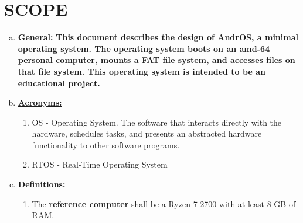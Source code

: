 \section{SCOPE}

\begin{enumerate}[(a)]
	\item \textbf{\underline{General:}} \textbf{This document describes the design of AndrOS, 
    a minimal operating system. The operating system boots on an amd-64 personal computer, 
    mounts a FAT file system, and accesses files on that file system. 
    This operating system is intended to be an educational project.}
\bigskip

	\item \textbf{\underline{Acronyms:}}
    \begin{enumerate}[]
      \item OS - Operating System. The software that interacts directly with the hardware, schedules tasks, and presents an abstracted hardware functionality to other software programs.
      \item RTOS - Real-Time Operating System
    \end{enumerate}
  \item \textbf{Definitions:} 
    \begin{enumerate}[]
      \item The \textbf{reference computer} shall be a Ryzen 7 2700 with at least 8 GB of RAM.
    \end{enumerate}


\end{enumerate}

